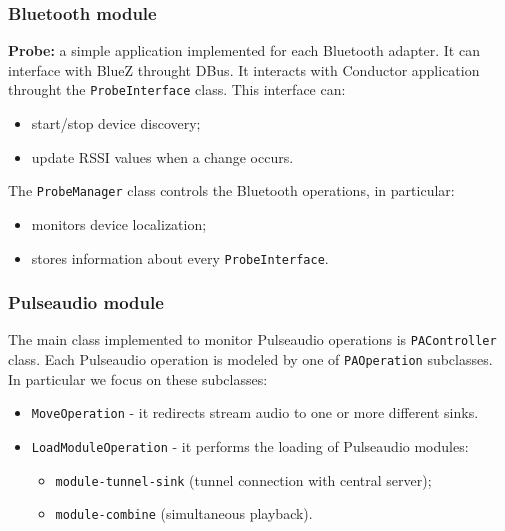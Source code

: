 \documentclass{beamer}
\begin{document}
	\begin{frame}
		\frametitle{Bluetooth module}
		\textbf{Probe:} a simple application implemented for each Bluetooth adapter. It can interface with BlueZ throught DBus. It interacts with Conductor application throught the \texttt{ProbeInterface} class. This interface can: 
		\begin{itemize}
		\item start/stop device discovery;
		\item update RSSI values when a change occurs.
		\end{itemize}
		\vspace{0.5cm}
		The \texttt{ProbeManager} class controls the Bluetooth operations, in particular:
		\begin{itemize}
		\item monitors device localization;
		\item stores information about every \texttt{ProbeInterface}.
		\end{itemize}
	
	\end{frame}
	
	\begin{frame}
		\frametitle{Pulseaudio module}
		The main class implemented to monitor Pulseaudio operations is \texttt{PAController} class. Each Pulseaudio operation is modeled by one of \texttt{PAOperation} subclasses. \\In particular we focus on these subclasses:

		\begin{itemize}
		\item \texttt{MoveOperation} - it redirects stream audio to one or more different sinks.
		\item \texttt{LoadModuleOperation} - it performs the loading of Pulseaudio modules:
			\begin{itemize}
			\item \texttt{module-tunnel-sink} (tunnel connection with central server);
			\item \texttt{module-combine} (simultaneous playback).
			\end{itemize}
		\end{itemize}
	
	\end{frame}
	
\end{document}
